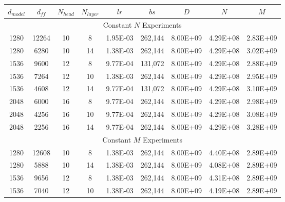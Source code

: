 \documentclass[11pt]{article}
\begin{document}
    \begin{table}
        [t]
        \centering
        \begin{tabular}{ccccccccc}
            \hline
            $d_{{model}}$ & $d_{{ff}}$  & $N_{{head}}$ & $N_{{layer}}$ & $lr$       & $bs$  & $D$        & $N$        & $M$        \\
            \hline
            \multicolumn{9}{c}{Constant $N$ Experiments} \\
            \hline
            1280                                       & 12264 & 10   & 8    & 1.95E-03 & 262,144 & 8.00E+09 & 4.29E+08 & 2.83E+09 \\
            1280                                       & 6280  & 10   & 14   & 1.38E-03 & 262,144 & 8.00E+09 & 4.29E+08 & 3.02E+09 \\
            1536                                       & 9600  & 12   & 8    & 9.77E-04 & 131,072  & 8.00E+09 & 4.29E+08 & 2.88E+09 \\
            1536                                       & 7264  & 12   & 10   & 1.38E-03 & 262,144 & 8.00E+09 & 4.29E+08 & 2.95E+09 \\
            1536                                       & 4608  & 12   & 14   & 9.77E-04 & 131,072  & 8.00E+09 & 4.29E+08 & 3.10E+09 \\
            2048                                       & 6000  & 16   & 8    & 9.77E-04 & 262,144 & 8.00E+09 & 4.29E+08 & 2.98E+09 \\
            2048                                       & 4256  & 16   & 10   & 9.77E-04 & 262,144 & 8.00E+09 & 4.29E+08 & 3.08E+09 \\
            2048                                       & 2256  & 16   & 14   & 9.77E-04 & 262,144 & 8.00E+09 & 4.29E+08 & 3.28E+09 \\
            \hline
            \multicolumn{9}{c}{Constant $M$ Experiments} \\
            \hline
            1280                                       & 12608 & 10   & 8    & 1.38E-03 & 262,144 & 8.00E+09 & 4.40E+08 & 2.89E+09 \\
            1280                                       & 5888  & 10   & 14   & 1.38E-03 & 262,144 & 8.00E+09 & 4.08E+08 & 2.89E+09 \\
            1536                                       & 9656  & 12   & 8    & 1.38E-03 & 262,144 & 8.00E+09 & 4.31E+08 & 2.89E+09 \\
            1536                                       & 7040  & 12   & 10   & 1.38E-03 & 262,144 & 8.00E+09 & 4.19E+08 & 2.89E+09 \\

\end{tabular}
\end{table}
\end{document}
